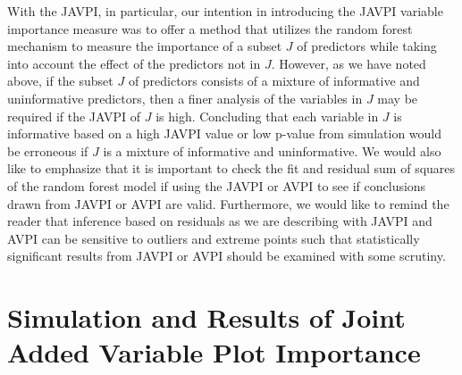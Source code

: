 \documentclass[12pt,twoside]{reedthesis}
\theoremstyle{definition}
\theoremstyle{definition}
\theoremstyle{definition}
\theoremstyle{remark}
\begin{document}
With the JAVPI, in particular, our intention in introducing the JAVPI
variable importance measure was to offer a method that utilizes the
random forest mechanism to measure the importance of a subset \(J\) of
predictors while taking into account the effect of the predictors not in
\(J\). However, as we have noted above, if the subset \(J\) of
predictors consists of a mixture of informative and uninformative
predictors, then a finer analysis of the variables in \(J\) may be
required if the JAVPI of \(J\) is high. Concluding that each variable in
\(J\) is informative based on a high JAVPI value or low p-value from
simulation would be erroneous if \(J\) is a mixture of informative and
uninformative. We would also like to emphasize that it is important to
check the fit and residual sum of squares of the random forest model if
using the JAVPI or AVPI to see if conclusions drawn from JAVPI or AVPI
are valid. Furthermore, we would like to remind the reader that
inference based on residuals as we are describing with JAVPI and AVPI
can be sensitive to outliers and extreme points such that statistically
significant results from JAVPI or AVPI should be examined with some
scrutiny. \par

\section{Simulation and Results of Joint Added Variable Plot
Importance}\label{simulation-and-results-of-joint-added-variable-plot-importance}
\end{document}
